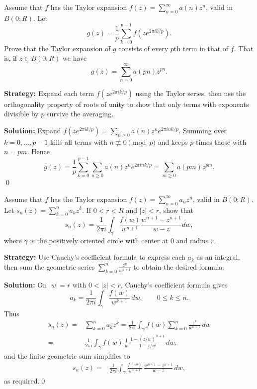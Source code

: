 \begin{problembox}
\begin{problemstatement}
Assume that \( f \) has the Taylor expansion \( f(z) = \sum_{n=0}^{\infty} a(n)z^n \), valid in \( B(0; R) \). Let
\[g(z) = \frac{1}{p} \sum_{k=0}^{p-1} f(ze^{2\pi ik/p}).\]
Prove that the Taylor expansion of \( g \) consists of every \( p \)th term in that of \( f \). That is, if \( z \in B(0; R) \) we have
\[g(z) = \sum_{n=0}^{\infty} a(pn)z^{pn}.\]
\end{problemstatement}
\end{problembox}

\noindent\textbf{Strategy:} Expand each term \( f(ze^{2\pi ik/p}) \) using the Taylor series, then use the orthogonality property of roots of unity to show that only terms with exponents divisible by \( p \) survive the averaging.

\bigskip\noindent\textbf{Solution:}
Expand $f(ze^{2\pi ik/p})=\sum_{n\ge0} a(n) z^n e^{2\pi i n k/p}$. Summing over $k=0,\dots,p-1$ kills all terms with $n\not\equiv0\pmod p$ and keeps $p$ times those with $n=pm$. Hence
\[g(z)=\frac1p\sum_{k=0}^{p-1}\sum_{n\ge0} a(n)z^n e^{2\pi i nk/p}=\sum_{m\ge0}a(pm) z^{pm}.\]\qed


\begin{problembox}
\begin{problemstatement}
Assume that \( f \) has the Taylor expansion \( f(z) = \sum_{n=0}^{\infty} a_n z^n \), valid in \( B(0; R) \). Let \( s_n(z) = \sum_{k=0}^{n} a_k z^k \). If \( 0 < r < R \) and \( |z| < r \), show that
\[ s_n(z) = \frac{1}{2\pi i} \int_\gamma \frac{f(w)}{w^{n+1}} \frac{w^{n+1} -z^{n+1}}{w - z} dw, \]
where \( \gamma \) is the positively oriented circle with center at 0 and radius \( r \).
\end{problemstatement}
\end{problembox}

\noindent\textbf{Strategy:} Use Cauchy's coefficient formula to express each \( a_k \) as an integral, then sum the geometric series \( \sum_{k=0}^n \frac{z^k}{w^{k+1}} \) to obtain the desired formula.

\bigskip\noindent\textbf{Solution:}
On $|w|=r$ with $0<|z|<r$, Cauchy's coefficient formula gives
\[a_k=\frac{1}{2\pi i}\int_\gamma \frac{f(w)}{w^{k+1}}\,dw,\qquad 0\le k\le n.\]
Thus
\begin{align*}
s_n(z)=&\sum_{k=0}^n a_k z^k=\frac{1}{2\pi i}\int_\gamma f(w)\sum_{k=0}^n \frac{z^k}{w^{k+1}}\,dw \\
=&\frac{1}{2\pi i}\int_\gamma f(w)\,\frac{1}{w}\,\frac{1-(z/w)^{\,n+1}}{1-z/w}\,dw,
\end{align*}
and the finite geometric sum simplifies to
\begin{align*}
s_n(z)=&\frac{1}{2\pi i}\int_\gamma \frac{f(w)}{w^{n+1}}\,\frac{w^{n+1}-z^{n+1}}{w-z}\,dw,
\end{align*}
as required.\qed


